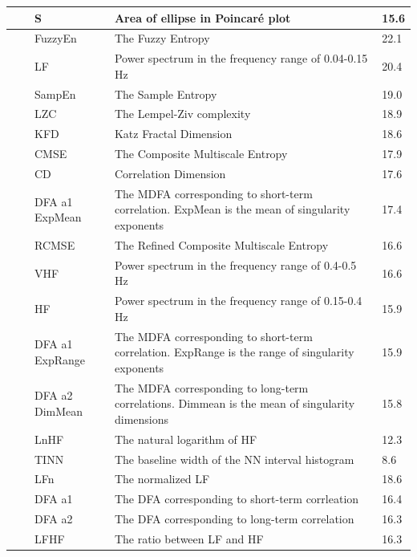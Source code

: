 \documentclass[
  english,
  jou,floatsintext]{apa6}
\begin{document}
\begin{table}[!h]
\begin{tabular}[t]{>{\raggedright\arraybackslash}p{8em}>{\raggedright\arraybackslash}p{9em}lll}
\cmidrule{3-5}
\multirow[t]{-17}{8em}{\raggedright\arraybackslash Distribution} & \multirow[t]{-12}{9em}{\raggedright\arraybackslash Dispersion} & S & Area of ellipse in Poincaré plot & 15.6\\
\cmidrule{1-5}
 &  & FuzzyEn & The Fuzzy Entropy & 22.1\\
\cmidrule{3-5}
 &  & LF & Power spectrum in the frequency range of 0.04-0.15 Hz & 20.4\\
\cmidrule{3-5}
 &  & SampEn & The Sample Entropy & 19.0\\
\cmidrule{3-5}
 &  & LZC & The Lempel-Ziv complexity & 18.9\\
\cmidrule{3-5}
 &  & KFD & Katz Fractal Dimension & 18.6\\
\cmidrule{3-5}
 &  & CMSE & The Composite Multiscale Entropy & 17.9\\
\cmidrule{3-5}
 &  & CD & Correlation Dimension & 17.6\\
\cmidrule{3-5}
 &  & DFA a1 ExpMean & The MDFA corresponding to short-term correlation. ExpMean is the mean of singularity exponents & 17.4\\
\cmidrule{3-5}
 &  & RCMSE & The Refined Composite Multiscale Entropy & 16.6\\
\cmidrule{3-5}
 &  & VHF & Power spectrum in the frequency range of 0.4-0.5 Hz & 16.6\\
\cmidrule{3-5}
 &  & HF & Power spectrum in the frequency range of 0.15-0.4 Hz & 15.9\\
\cmidrule{3-5}
 &  & DFA a1 ExpRange & The MDFA corresponding to short-term correlation. ExpRange is the range of singularity exponents & 15.9\\
\cmidrule{3-5}
 &  & DFA a2 DimMean & The MDFA corresponding to long-term correlations. Dimmean is the mean of singularity dimensions & 15.8\\
\cmidrule{3-5}
 &  & LnHF & The natural logarithm of HF & 12.3\\
\cmidrule{3-5}
 & \multirow[t]{-15}{9em}{\raggedright\arraybackslash Absolute Frequency/Complexity} & TINN & The baseline width of the NN interval histogram & 8.6\\
\cmidrule{2-5}
 &  & LFn & The normalized LF & 18.6\\
\cmidrule{3-5}
 &  & DFA a1 & The DFA corresponding to short-term corrleation & 16.4\\
\cmidrule{3-5}
 &  & DFA a2 & The DFA corresponding to long-term correlation & 16.3\\
\cmidrule{3-5}
 &  & LFHF & The ratio between LF and HF & 16.3\\

\end{tabular}
\end{table}
\end{document}
